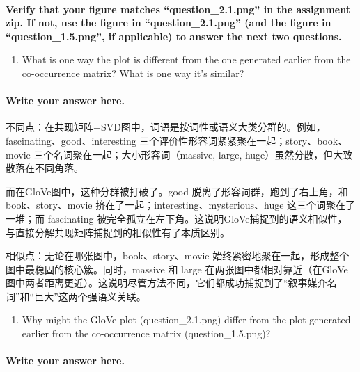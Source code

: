 \documentclass[11pt]{article}
\providecommand{\tightlist}{%
      \setlength{\itemsep}{0pt}\setlength{\parskip}{0pt}}
\begin{document}
    \begin{center}
    \end{center}
    { \hspace*{\fill} \\}
    
    \textbf{Verify that your figure matches ``question\_2.1.png'' in the
assignment zip. If not, use the figure in ``question\_2.1.png'' (and the
figure in ``question\_1.5.png'', if applicable) to answer the next two
questions.}

    \begin{enumerate}
\def\labelenumi{\alph{enumi}.}
\tightlist
\item
  What is one way the plot is different from the one generated earlier
  from the co-occurrence matrix? What is one way it's similar?
\end{enumerate}

    \paragraph{Write your answer here.}\label{write-your-answer-here.}

不同点：在共现矩阵+SVD图中，词语是按词性或语义大类分群的。例如，fascinating、good、interesting
三个评价性形容词紧紧聚在一起；story、book、movie
三个名词聚在一起；大小形容词（massive, large,
huge）虽然分散，但大致散落在不同角落。

而在GloVe图中，这种分群被打破了。good 脱离了形容词群，跑到了右上角，和
book、story、movie 挤在了一起；interesting、mysterious、huge
这三个词聚在了一堆；而 fascinating
被完全孤立在左下角。这说明GloVe捕捉到的语义相似性，与直接分解共现矩阵捕捉到的相似性有了本质区别。

相似点：无论在哪张图中，book、story、movie
始终紧密地聚在一起，形成整个图中最稳固的核心簇。同时，massive 和 large
在两张图中都相对靠近（在GloVe图中两者距离更近）。这说明尽管方法不同，它们都成功捕捉到了``叙事媒介名词''和``巨大''这两个强语义关联。

    \begin{enumerate}
\def\labelenumi{\alph{enumi}.}
\setcounter{enumi}{1}
\tightlist
\item
  Why might the GloVe plot (question\_2.1.png) differ from the plot
  generated earlier from the co-occurrence matrix (question\_1.5.png)?
\end{enumerate}

    \paragraph{Write your answer here.}\label{write-your-answer-here.}
\end{document}
